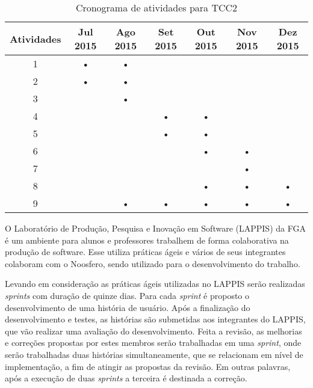 \begin{table}[h]
    \centering

    \begin{tabular}{|c|c|c|c|c|c|c|}
        \hline
        \textbf{Atividades} & \textbf{Jul 2015} & \textbf{Ago 2015} & \textbf{Set 2015}
        & \textbf{Out 2015} & \textbf{Nov 2015} & \textbf{Dez 2015} \\
        \hline\hline

        \hline
        1   & • & • &   &   &   &   \\

        \hline
        2   &  • & • &   &   &   &   \\

        \hline
        3   &   & • &   &   &   &   \\

        \hline
        4   &   &   & • & • &   &   \\

        \hline
        5   &   &   & • & • &   &   \\

        \hline
        6   &   &   &   & • & • &   \\

        \hline
        7   &   &   &   &   & • &   \\

        \hline
        8   &   &   &   & • & • & • \\

        \hline
        9   &   & •  & • & • & • & • \\

        \hline
    \end{tabular}

    \caption{Cronograma de atividades para TCC2}
    \label{cronograma}
\end{table}

O Laboratório de Produção, Pesquisa e Inovação em Software (LAPPIS) da FGA é um ambiente para  alunos e professores trabalhem de forma colaborativa na produção de software. Esse utiliza práticas ágeis e vários de seus integrantes colaboram com o Noosfero, sendo utilizado para o desenvolvimento do trabalho.

Levando em consideração as práticas ágeis utilizadas no LAPPIS serão realizadas \textit{sprints} com duração de quinze dias. Para cada \textit{sprint} é proposto o desenvolvimento de uma história de usuário. Após a finalização do desenvolvimento e testes, as histórias são submetidas aos integrantes do LAPPIS, que vão realizar uma avaliação do desenvolvimento. Feita a revisão, as melhorias e correções propostas por estes membros serão trabalhadas em uma \textit{sprint}, onde serão trabalhadas duas histórias simultaneamente, que se relacionam em nível de implementação, a fim de atingir as propostas da revisão. Em outras palavras, após a execução de duas \textit{sprints} a terceira é destinada a correção.